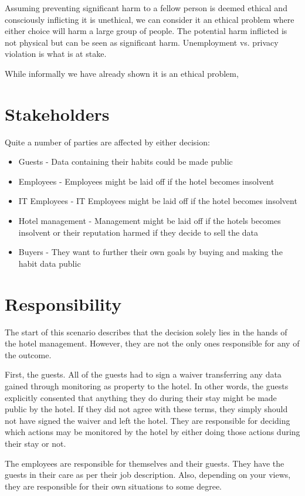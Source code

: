 Assuming preventing significant harm to a fellow person is deemed ethical and consciously inflicting it is unethical, we can consider it an ethical problem where either choice will harm a large group of people. The potential harm inflicted is not physical but can be seen as significant harm. Unemployment vs. privacy violation is what is at stake.

While informally we have already shown it is an ethical problem, 

\section{Stakeholders}
Quite a number of parties are affected by either decision:

\begin{itemize}
	\item Guests - Data containing their habits could be made public
	\item Employees - Employees might be laid off if the hotel becomes insolvent
	\item IT Employees - IT Employees might be laid off if the hotel becomes insolvent
	\item Hotel management - Management might be laid off if the hotels becomes insolvent or their reputation harmed if they decide to sell the data
	\item Buyers - They want to further their own goals by buying and making the habit data public
\end{itemize}


\section{Responsibility}
The start of this scenario describes that the decision solely lies in the hands of the hotel management. However, they are not the only ones responsible for any of the outcome.

First, the guests. All of the guests had to sign a waiver transferring any data gained through monitoring as property to the hotel. In other words, the guests explicitly consented that anything they do during their stay might be made public by the hotel. If they did not agree with these terms, they simply should not have signed the waiver and left the hotel. They are responsible for deciding which actions may be monitored by the hotel by either doing those actions during their stay or not.

The employees are responsible for themselves and their guests. They have the guests in their care as per their job description. Also, depending on your views, they are responsible for their own situations to some degree.

